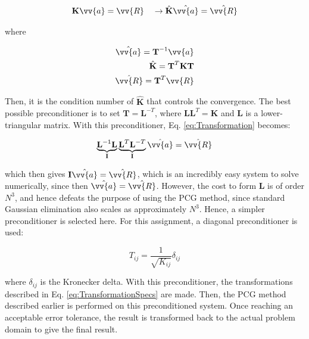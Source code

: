 \documentclass[10pt]{article}
\begin{document}
\begin{equation}
\label{eq:Transformation}
\textbf{K}\vv{a}=\vv{R}\quad\rightarrow\hat{\textbf{K}}\hat{\vv{a}}=\hat{\vv{R}}
\end{equation}

where

\begin{equation}
\label{eq:TransformationSpecs}
\begin{aligned}
\hat{\vv{a}}=\textbf{T}^{-1}\vv{a}\\
\hat{\textbf{K}}=\textbf{T}^{T}\textbf{K}\textbf{T}\\
\hat{\vv{R}}=\textbf{T}^T\vv{R}\\
\end{aligned}
\end{equation}

Then, it is the condition number of \(\hat{\textbf{K}}\) that controls the convergence. The best possible preconditioner is to set \(\textbf{T}=\textbf{L}^{-T}\), where \(\textbf{L}\textbf{L}^T=\textbf{K}\) and \textbf{L} is a lower-triangular matrix. With this preconditioner, Eq. \eqref{eq:Transformation} becomes:

\begin{equation}
\label{eq:Transformation2}
\underbrace{\textbf{L}^{-1}\textbf{L}}_\text{\textbf{I}}\underbrace{\textbf{L}^T\textbf{L}^{-T}}_\text{\textbf{I}}\hat{\vv{a}}=\hat{\vv{R}}
\end{equation}

which then gives \(\textbf{I}\hat{\vv{a}}=\hat{\vv{R}}\), which is an incredibly easy system to solve numerically, since then \(\hat{\vv{a}}=\hat{\vv{R}}\). However, the cost to form \(\textbf{L}\) is of order \(N^3\), and hence defeats the purpose of using the PCG method, since standard Gaussian elimination also scales as approximately \(N^3\). Hence, a simpler preconditioner is selected here. For this assignment, a diagonal preconditioner is used:

\begin{equation}
T_{ij}=\frac{1}{\sqrt{K_{ij}}}\delta_{ij}
\end{equation}

where \(\delta_{ij}\) is the Kronecker delta. With this preconditioner, the transformations described in Eq. \eqref{eq:TransformationSpecs} are made. Then, the PCG method described earlier is performed on this preconditioned system. Once reaching an acceptable error tolerance, the result is transformed back to the actual problem domain to give the final result.
\end{document}
